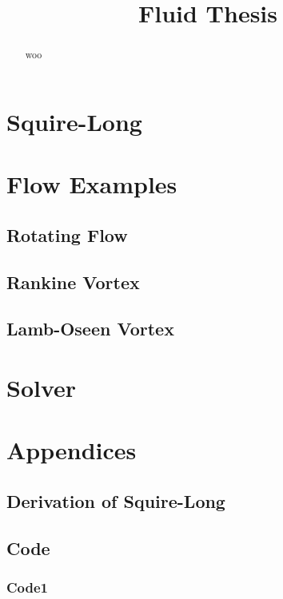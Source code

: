 \documentclass{X:/Documents/Coding/Latex/myreport}
\title{Fluid Thesis}
\begin{document}
\maketitle
\begin{abstract}
	woo
\end{abstract}

\chapter{Squire-Long}
%

\chapter{Flow Examples}
\section{Rotating Flow}
\section{Rankine Vortex}
\section{Lamb-Oseen Vortex}

\chapter{Solver}

\chapter{Appendices}
\appendix
\section{Derivation of Squire-Long}

\section{Code}
\subsection{Code1}
\end{document}
